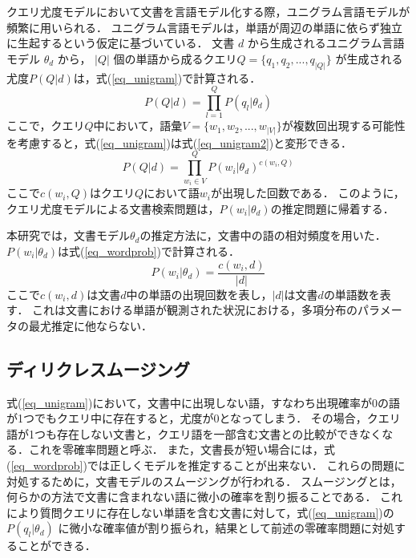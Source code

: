 クエリ尤度モデルにおいて文書を言語モデル化する際，ユニグラム言語モデルが頻繁に用いられる．
ユニグラム言語モデルは，単語が周辺の単語に依らず独立に生起するという仮定に基づいている．
文書 $d$ から生成されるユニグラム言語モデル $\theta_d$ から， $|Q|$ 個の単語から成るクエリ$Q = \{q_1, q_2, ..., q_{|Q|}\}$ が生成される尤度$P(Q|d)$は，式(\ref{eq_unigram})で計算される．
\begin{equation}
    P(Q|d) = \prod^{Q}_{l=1}P(q_l|\theta_d) \label{eq_unigram}
\end{equation}
ここで，クエリ$Q$中において，語彙$V = \{w_1, w_2, ..., w_|V|\}$が複数回出現する可能性を考慮すると，式(\ref{eq_unigram})は式(\ref{eq_unigram2})と変形できる．
\begin{equation}
    P(Q|d) = \prod^{Q}_{w_i \in V}P(w_i|\theta_d)^{c(w_i, Q)} \label{eq_unigram2}
\end{equation}
ここで$c(w_i, Q)$はクエリ$Q$において語$w_i$が出現した回数である．
このように，クエリ尤度モデルによる文書検索問題は，$P(w_i|\theta_d)$の推定問題に帰着する．

本研究では，文書モデル$\theta_d$の推定方法に，文書中の語の相対頻度を用いた．
$P(w_i|\theta_d)$は式(\ref{eq_wordprob})で計算される．
\begin{equation}
    P(w_i|\theta_d) = \frac{c(w_i,d)}{|d|}    \label{eq_wordprob}
\end{equation}
ここで$c(w_i,d)$は文書$d$中の単語の出現回数を表し，$|d|$は文書$d$の単語数を表す．
これは文書における単語が観測された状況における，多項分布のパラメータの最尤推定に他ならない．

\subsection{ディリクレスムージング}  \label{sec_dirichlet}
式(\ref{eq_unigram})において，文書中に出現しない語，すなわち出現確率が0の語が1つでもクエリ中に存在すると，尤度が0となってしまう．
その場合，クエリ語が1つも存在しない文書と，クエリ語を一部含む文書との比較ができなくなる．これを零確率問題と呼ぶ．
また，文書長が短い場合には，式(\ref{eq_wordprob})では正しくモデルを推定することが出来ない．
これらの問題に対処するために，文書モデルのスムージングが行われる．
スムージングとは，何らかの方法で文書に含まれない語に微小の確率を割り振ることである．
これにより質問クエリに存在しない単語を含む文書に対して，式(\ref{eq_unigram})の $P(q_l|\theta_d)$ に微小な確率値が割り振られ，結果として前述の零確率問題に対処することができる．

